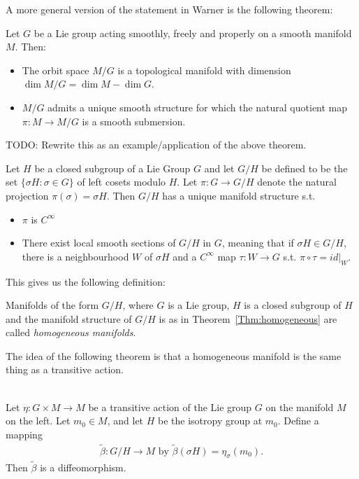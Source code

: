 A more general version of the statement in Warner is the following theorem:
\begin{theorem}
Let $G$ be a Lie group acting smoothly, freely and properly on a smooth manifold $M$. Then:
\begin{itemize}
\item The orbit space $M/G$ is a topological manifold with dimension $\dim M/G = \dim M - \dim G$.
\item $M/G$ admits a unique smooth structure for which the natural quotient map $\pi \colon M \to M/G$ is a smooth submersion.
\end{itemize}
\end{theorem}


\begin{example}\label{Thm:homogeneous}
\textup{\cite[3.58]{Warner1983}}
TODO: Rewrite this as an example/application of the above theorem.

Let $H$ be a closed subgroup of a Lie Group $G$ and let $G/H$ be defined to be the set $\{\sigma H \colon \sigma \in G\}$ of left cosets modulo $H$. Let $\pi \colon G \to G/H$ denote the natural projection $\pi(\sigma) = \sigma H$. Then $G/H$ has a unique manifold structure s.t.
\begin{itemize}
\item $\pi$ is $C^{\infty}$
\item There exist local smooth sections of $G/H$ in $G$, meaning that if $\sigma H \in G/H$, there is a neighbourhood $W$ of $\sigma H$ and a $C^{\infty}$ map $\tau \colon W \to G$ s.t. $\pi \circ \tau = id\vert_W$.
\end{itemize}
\end{example}


This gives us the following definition:
\begin{definition} 
\textup{\cite[3.59]{Warner1983}}
Manifolds of the form $G/H$, where $G$ is a Lie group, $H$ is a closed subgroup of $H$ and the manifold structure of $G/H$ is as in Theorem~\ref{Thm:homogeneous} are called \emph{homogeneous manifolds}.
\end{definition}

The idea of the following theorem is that a homogeneous manifold is the same thing as a transitive action.

\begin{theorem}
\label{thm:transitive action homogeneous manifold}
\textup{\cite[3.62]{Warner1983}}\\
Let $\eta \colon G \times M \to M$ be a transitive action of the Lie group $G$ on the manifold $M$ on the left. Let $m_0 \in M$, and let $H$ be the isotropy group at $m_0$. Define a mapping
\begin{align*}
\tilde{\beta} \colon G/H \to M \text{ by } \tilde{\beta}(\sigma H) = \eta_{\sigma}(m_0).
\end{align*}
Then $\tilde{\beta}$ is a diffeomorphism.
\end{theorem}

